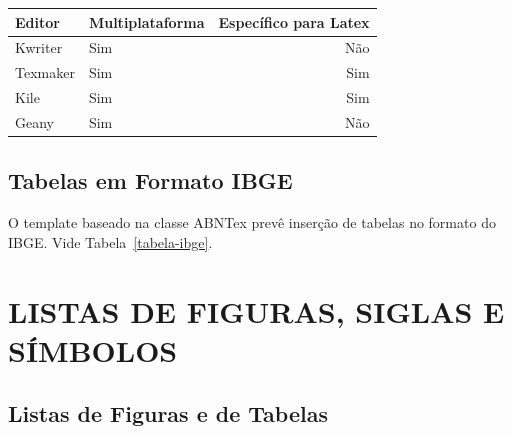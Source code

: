 \documentclass{templateppgmo}
\numberwithin{figure}{chapter}
\numberwithin{table}{chapter}
\numberwithin{quadro}{chapter}
\numberwithin{algoritmo}{chapter}
\numberwithin{codigo}{chapter}
\begin{document}
\begin{quadro}[htb]
\centering
\caption{Editores de Texto Livres.} \label{quadro:editores_texto_livres}
\begin{tabular}{|l|l|r|}        \hline
Editor     & Multiplataforma & Específico para Latex \\ \hline
Kwriter    & Sim             & Não                   \\
Texmaker   & Sim             & Sim                   \\
Kile       & Sim             & Sim                   \\
Geany      & Sim             & Não                   \\ \hline
\end{tabular}

\end{quadro}



\section{Tabelas em Formato IBGE}

O template baseado na classe ABNTex prevê inserção de tabelas no formato do IBGE. Vide Tabela~\ref{tabela-ibge}.

\begin{table}[H]
  \end{table}


\chapter{LISTAS DE FIGURAS, SIGLAS E SÍMBOLOS}

\section{Listas de Figuras e de Tabelas}
\end{document}
